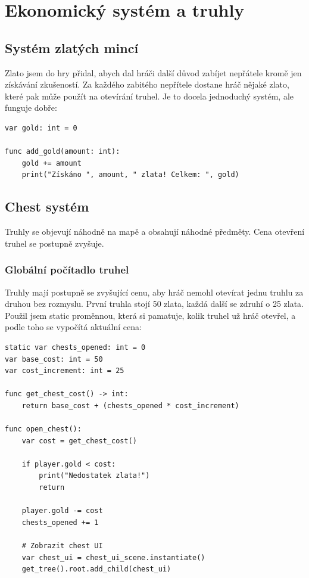 \documentclass[12pt, a4paper,
oneside
]{report}
\begin{document}
	\chapter{Ekonomický systém a truhly}
	\nopagebreak
	
	\section{Systém zlatých mincí}
	\nopagebreak
	
	Zlato jsem do hry přidal, abych dal hráči další důvod zabíjet nepřátele kromě jen získávání zkušeností. Za každého zabitého nepřítele dostane hráč nějaké zlato, které pak může použít na otevírání truhel. Je to docela jednoduchý systém, ale funguje dobře:
	
\begin{lstlisting}[style=GDScript, caption={Gold systém}]
var gold: int = 0

func add_gold(amount: int):
	gold += amount
	print("Získáno ", amount, " zlata! Celkem: ", gold)
\end{lstlisting}

	\section{Chest systém}
	\nopagebreak
	
	Truhly se objevují náhodně na mapě a obsahují náhodné předměty. Cena otevření truhel se postupně zvyšuje.
	\nopagebreak
	
	\subsection{Globální počítadlo truhel}
	\nopagebreak
	
	Truhly mají postupně se zvyšující cenu, aby hráč nemohl otevírat jednu truhlu za druhou bez rozmyslu. První truhla stojí 50 zlata, každá další se zdruhí o 25 zlata. Použil jsem static proměnnou, která si pamatuje, kolik truhel už hráč otevřel, a podle toho se vypočítá aktuální cena:
	\nopagebreak
	
\begin{lstlisting}[style=GDScript, caption={Progrese ceny truhel}]
static var chests_opened: int = 0
var base_cost: int = 50
var cost_increment: int = 25

func get_chest_cost() -> int:
	return base_cost + (chests_opened * cost_increment)

func open_chest():
	var cost = get_chest_cost()
	
	if player.gold < cost:
		print("Nedostatek zlata!")
		return
	
	player.gold -= cost
	chests_opened += 1
	
	# Zobrazit chest UI
	var chest_ui = chest_ui_scene.instantiate()
	get_tree().root.add_child(chest_ui)
\end{lstlisting}
\end{document}
